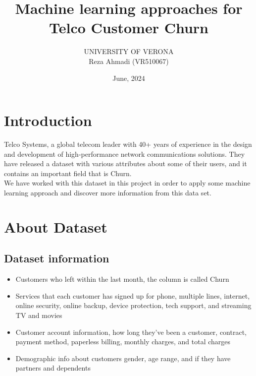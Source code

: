 \documentclass{article}
\begin{document}
\setcounter{section}{0}

\title{Machine learning approaches for \\ Telco Customer Churn}
\author{UNIVERSITY OF VERONA \\ Reza Ahmadi (VR510067)}
\date{June, 2024}
\maketitle

\newpage

\tableofcontents

\newpage

\section{Introduction}
Telco Systems, a global telecom leader with 40+ years of experience in the design and development of high-performance network communications solutions.
They have released a dataset with various attributes about some of their users, and it contains an important field that is Churn.\\
We have worked with this dataset in this project in order to apply some machine learning approach and discover more information from this data set.

\section{About Dataset}
\subsection{Dataset information}
\begin{itemize}
  \item Customers who left within the last month, the column is called Churn
  \item Services that each customer has signed up for phone, multiple lines, internet, online security, online backup, device protection, tech support, and streaming TV and movies
  \item Customer account information, how long they've been a customer, contract, payment method, paperless billing, monthly charges, and total charges
  \item Demographic info about customers gender, age range, and if they have partners and dependents
\end{itemize}
\end{document}
